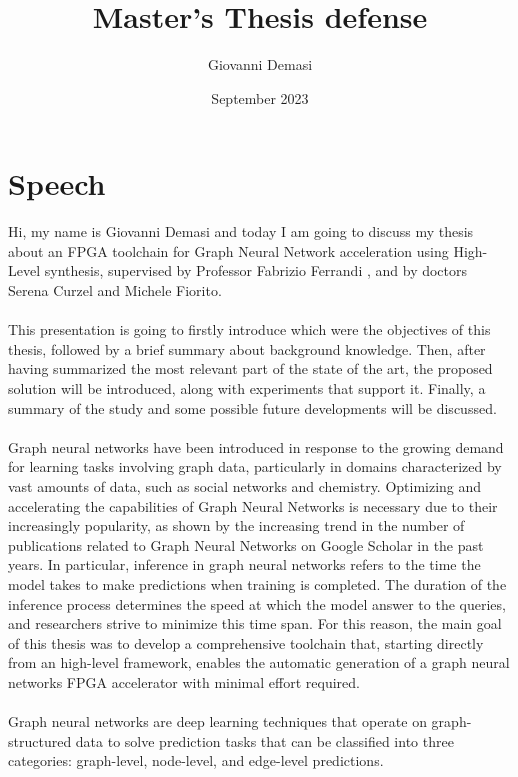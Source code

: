 \documentclass{article}
\title{\textbf{Master's Thesis defense}}
\author{Giovanni Demasi}
\date{September 2023}
\begin{document}
\maketitle

\section{Speech}

\noindent
Hi, my name is Giovanni Demasi and today I am going to discuss my thesis about an FPGA toolchain for Graph Neural Network acceleration using High-Level synthesis, supervised by Professor Fabrizio Ferrandi , and by doctors Serena Curzel and Michele Fiorito. 
\\
\\
\noindent
This presentation is going to firstly introduce which were the objectives of this thesis, followed by a brief summary about background knowledge.
Then, after having summarized the most relevant part of the state of the art, the proposed solution will be introduced, along with experiments that support it.
Finally, a summary of the study and some possible future developments will be discussed.
\\
\\
\noindent
Graph neural networks have been introduced in response to the growing demand for learning tasks involving graph data, particularly in domains characterized by vast amounts of data, such as social networks and chemistry.
Optimizing and accelerating the capabilities of Graph Neural Networks is necessary due to their increasingly popularity, as shown by the increasing trend in the number of publications related to Graph Neural Networks on Google Scholar in the past years. 
In particular, inference in graph neural networks refers to the time the model takes to make predictions when training is completed. The duration of the inference process determines the speed at which the model answer to the queries, and researchers strive to minimize this time span. 
For this reason, the main goal of this thesis was to develop a  comprehensive toolchain that, starting directly from an high-level framework, enables the automatic generation of a graph neural networks FPGA accelerator with minimal effort required. 
\\
\\
\noindent
Graph neural networks are deep learning techniques that operate on graph-structured data to solve prediction tasks that can be classified into three categories: graph-level, node-level, and edge-level predictions.
\end{document}
